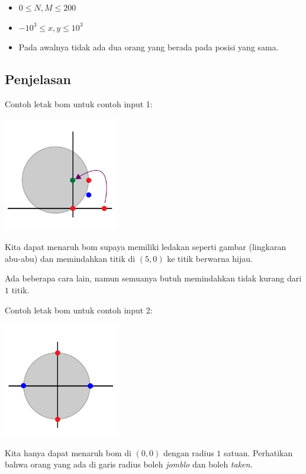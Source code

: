 \documentclass{article}
\begin{document}
\begin{itemize}
  \item $0 \leq N,M \leq 200$
  \item $-10^3 \leq x, y \leq 10^3$
  \item Pada awalnya tidak ada dua orang yang berada pada posisi yang sama.
\end{itemize}

\subsection*{Penjelasan}

\par\noindent Contoh letak bom untuk contoh input 1:

\includegraphics[width=5cm]{sample-1}

\par\noindent Kita dapat menaruh bom supaya memiliki ledakan seperti gambar (lingkaran abu-abu) dan memindahkan titik di $(5,0)$ ke titik berwarna hijau.

\par\noindent Ada beberapa cara lain, namun semuanya butuh memindahkan tidak kurang dari $1$ titik.

\par\noindent Contoh letak bom untuk contoh input 2:

\includegraphics[width=5cm]{sample-2}

\par\noindent Kita hanya dapat menaruh bom di $(0,0)$ dengan radius $1$ satuan. Perhatikan bahwa orang yang ada di garis radius boleh \textit{jomblo} dan boleh \textit{taken}.
\end{document}
